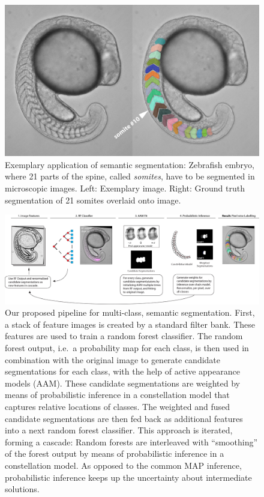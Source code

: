 \documentclass[10pt,twocolumn,letterpaper]{article}
\begin{document}
\begin{figure}[t]
\begin{center}
\includegraphics[width=\columnwidth]{TopRight.jpg} %
\caption{Exemplary application of semantic segmentation: Zebrafish embryo, where 21 parts of the spine, called \emph{somites}, have to be segmented in microscopic images. Left: Exemplary image. Right: Ground truth segmentation of 21 somites overlaid onto image. }
\label{fig:teaser}
\end{center}
\end{figure}
\begin{figure}[t]
\begin{center}
\includegraphics[width=\textwidth]{pipelineBIG2.jpg} %
\caption{Our proposed pipeline for multi-class, semantic segmentation. First, a stack of feature images is created by a standard filter bank. These features are used to train a random forest classifier. The random forest output, i.e.\ a probability map for each class, is then used in combination with the original image to generate candidate segmentations for each class, with the help of active appearance models (AAM). These candidate segmentations are weighted by means of probabilistic inference in a constellation model that captures relative locations of classes. The weighted and fused candidate segmentations are then fed back as additional features into a next random forest classifier. This approach is iterated, forming a cascade: Random forests are interleaved with ``smoothing'' of the forest output by means of probabilistic inference in a constellation model. As opposed to the common MAP inference, probabilistic inference keeps up the uncertainty about intermediate solutions.}
\label{fig:pipeline}
\end{center}
\end{figure}
\end{document}
